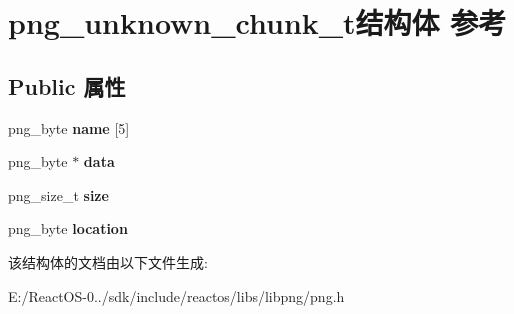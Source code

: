 \hypertarget{structpng__unknown__chunk__t}{}\section{png\+\_\+unknown\+\_\+chunk\+\_\+t结构体 参考}
\label{structpng__unknown__chunk__t}
\subsection*{Public 属性}
\begin{DoxyCompactItemize}
\item 
\mbox{\label{structpng__unknown__chunk__t_aed965186b30a6f15541d20d7dd8a6849}} 
png\+\_\+byte {\bfseries name} \mbox{[}5\mbox{]}
\item 
\mbox{\label{structpng__unknown__chunk__t_a4f37f6acbe4e2c287078bcdf03d8ee92}} 
png\+\_\+byte $\ast$ {\bfseries data}
\item 
\mbox{\label{structpng__unknown__chunk__t_a0a691245e0c04f01ecf767f215b6a652}} 
png\+\_\+size\+\_\+t {\bfseries size}
\item 
\mbox{\label{structpng__unknown__chunk__t_af56bfc32223b97fbcb6bd29ba7a1cc29}} 
png\+\_\+byte {\bfseries location}
\end{DoxyCompactItemize}


该结构体的文档由以下文件生成\+:\begin{DoxyCompactItemize}
\item 
E\+:/\+React\+O\+S-\/0../sdk/include/reactos/libs/libpng/png.\+h\end{DoxyCompactItemize}
